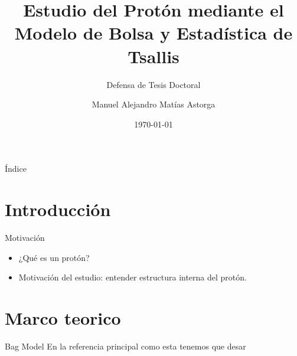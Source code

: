 \documentclass{beamer}
\title{Estudio del Protón mediante el Modelo de Bolsa y Estadística de Tsallis}
\subtitle{Defensa de Tesis Doctoral}
\author{Manuel Alejandro Matías Astorga}
\date{\today}
\institute{CINVESTAV IPN}
\begin{document}
\maketitle

\begin{frame}{Índice}
  \tableofcontents
\end{frame}

\section{Introducción}
\begin{frame}{Motivación}
  \begin{itemize}
    \item ¿Qué es un protón?
    \item Motivación del estudio: entender estructura interna del protón.
  \end{itemize}
\end{frame}

\section{Marco teorico}

\begin{frame}{Bag Model}
    En la referencia principal como esta \cite{Barboza_Mendoza_2019} tenemos que desar
\end{frame}


\appendix
\renewcommand\bibname{Bibliografía}


\end{document}
